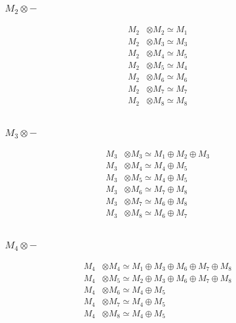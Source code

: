 \subsubsection{$ M_{2}\otimes -$}
\begin{align*}
M_{2} &\otimes M_{2} \simeq M_{1} \\
M_{2} &\otimes M_{3} \simeq M_{3} \\
M_{2} &\otimes M_{4} \simeq M_{5} \\
M_{2} &\otimes M_{5} \simeq M_{4} \\
M_{2} &\otimes M_{6} \simeq M_{6} \\
M_{2} &\otimes M_{7} \simeq M_{7} \\
M_{2} &\otimes M_{8} \simeq M_{8} \\
\end{align*}

\subsubsection{$ M_{3}\otimes -$}
\begin{align*}
M_{3} &\otimes M_{3} \simeq M_{1} \oplus M_{2} \oplus M_{3} \\
M_{3} &\otimes M_{4} \simeq M_{4} \oplus M_{5} \\
M_{3} &\otimes M_{5} \simeq M_{4} \oplus M_{5} \\
M_{3} &\otimes M_{6} \simeq M_{7} \oplus M_{8} \\
M_{3} &\otimes M_{7} \simeq M_{6} \oplus M_{8} \\
M_{3} &\otimes M_{8} \simeq M_{6} \oplus M_{7} \\
\end{align*}

\subsubsection{$ M_{4}\otimes -$}
\begin{align*}
M_{4} &\otimes M_{4} \simeq M_{1} \oplus M_{3} \oplus M_{6} \oplus M_{7} \oplus M_{8} \\
M_{4} &\otimes M_{5} \simeq M_{2} \oplus M_{3} \oplus M_{6} \oplus M_{7} \oplus M_{8} \\
M_{4} &\otimes M_{6} \simeq M_{4} \oplus M_{5} \\
M_{4} &\otimes M_{7} \simeq M_{4} \oplus M_{5} \\
M_{4} &\otimes M_{8} \simeq M_{4} \oplus M_{5} \\
\end{align*}

